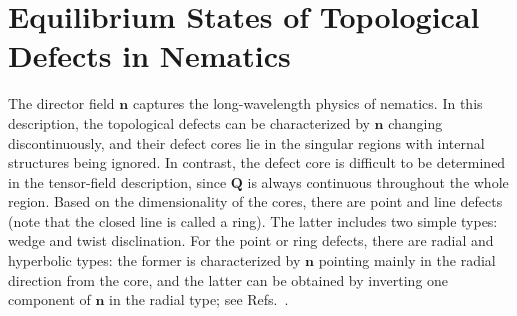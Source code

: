 \documentclass[nottitlepage]{article}
\begin{document}
\section {Equilibrium States of Topological Defects in Nematics}
\label{sssecc:topo}
The director field $\mathbf{n}$ captures the long-wavelength physics of nematics. In this description, the topological defects can be characterized by $\mathbf{n}$ changing discontinuously, and their defect cores lie in the singular regions with internal structures being ignored. In contrast, the defect core is difficult to  be determined in the tensor-field description, since $\mathbf{Q}$ is always continuous throughout the whole region. Based on the dimensionality of the cores, there are point and line  defects (note that the closed line is called a ring). The latter includes two simple types: wedge and twist disclination. For the point or ring defects, there are radial and hyperbolic types: the former is characterized by $\mathbf{n}$ pointing mainly in the radial direction from the core, and the latter can be obtained by inverting one component of $\mathbf{n}$ in the radial type; see Refs.~\cite{de gennes, zar, luca, paul2}.
\end{document}

